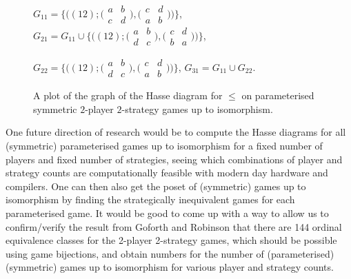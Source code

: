 \begin{figure}[!ht]
\begin{center}
		\end{center}
		
		\begin{center}
		$G_{11} = \{\bigl((12) ; \bigl(\begin{smallmatrix} a & b \\ c & d \end{smallmatrix}\bigr), \bigl(\begin{smallmatrix} c & d \\ a & b \end{smallmatrix}\bigr)\bigr)\}$, $G_{21} = G_{11} \cup \{\bigl((12) ; \bigl(\begin{smallmatrix} a & b \\ d & c \end{smallmatrix}\bigr), \bigl(\begin{smallmatrix} c & d \\ b & a \end{smallmatrix}\bigr)\bigr)\}$,
		
		$G_{22} = \{\bigl((12) ; \bigl(\begin{smallmatrix} a & b \\ d & c \end{smallmatrix}\bigr), \bigl(\begin{smallmatrix} c & d \\ a & b \end{smallmatrix}\bigr)\bigr)\}$, $G_{31} = G_{11} \cup G_{22}$.
		\end{center}
		\vspace{-0.5cm}
		\caption{A plot of the graph of the Hasse diagram for $\leq$ on parameterised symmetric $2$-player $2$-strategy games up to isomorphism.}
		\label{2pHasse}
	\end{figure}
	
	One future direction of research would be to compute the Hasse diagrams for all (symmetric) parameterised games up to isomorphism for a fixed number of players and fixed number of strategies, seeing which combinations of player and strategy counts are computationally feasible with modern day hardware and compilers. One can then also get the poset of (symmetric) games up to isomorphism by finding the strategically inequivalent games for each parameterised game. It would be good to come up with a way to allow us to confirm/verify the result from Goforth and Robinson \cite{GoforthRobinson} that there are 144 ordinal equivalence classes for the 2-player 2-strategy games, which should be possible using game bijections, and obtain numbers for the number of (parameterised) (symmetric) games up to isomorphism for various player and strategy counts.
	
